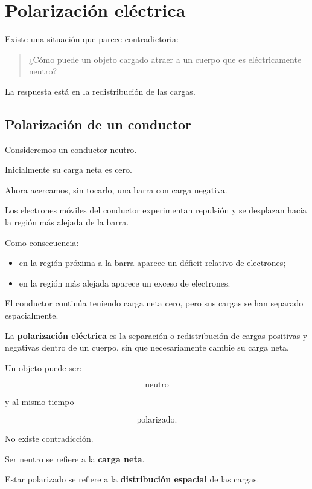 \section{Polarización eléctrica}

Existe una situación que parece contradictoria:

\begin{quote}
¿Cómo puede un objeto cargado atraer a un cuerpo que es eléctricamente
neutro?
\end{quote}

La respuesta está en la redistribución de las cargas.



\subsection{Polarización de un conductor}

Consideremos un conductor neutro.

Inicialmente su carga neta es cero.

Ahora acercamos, sin tocarlo, una barra con carga negativa.

Los electrones móviles del conductor experimentan repulsión y se desplazan
hacia la región más alejada de la barra.

Como consecuencia:

\begin{itemize}
    \item en la región próxima a la barra aparece un déficit relativo de
    electrones;

    \item en la región más alejada aparece un exceso de electrones.
\end{itemize}

El conductor continúa teniendo carga neta cero, pero sus cargas se han
separado espacialmente.

\begin{definicion}[Polarización]
La \textbf{polarización eléctrica} es la separación o redistribución de
cargas positivas y negativas dentro de un cuerpo, sin que necesariamente
cambie su carga neta.
\end{definicion}

\begin{idea}
Un objeto puede ser:

\[
\text{neutro}
\]

y al mismo tiempo

\[
\text{polarizado}.
\]

No existe contradicción.

Ser neutro se refiere a la \textbf{carga neta}.

Estar polarizado se refiere a la \textbf{distribución espacial} de las
cargas.
\end{idea}


